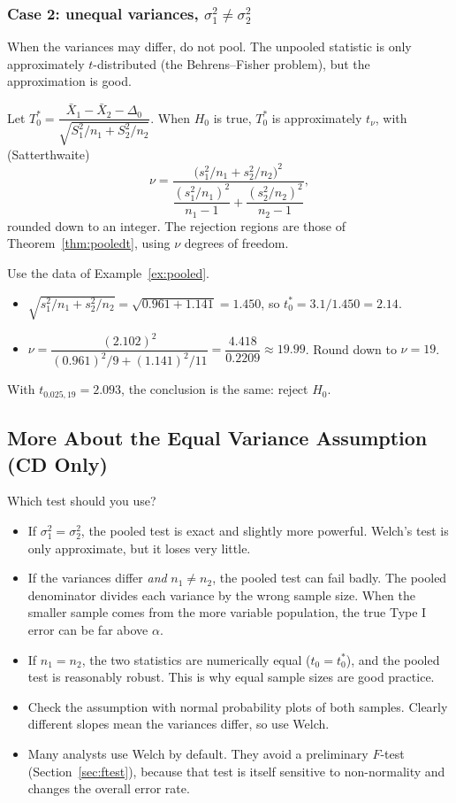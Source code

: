 \subsubsection*{Case 2: unequal variances, $\sigma_1^2\ne\sigma_2^2$}

When the variances may differ, do not pool. The unpooled statistic is only approximately $t$-distributed (the Behrens--Fisher problem), but the approximation is good.

\begin{theorem}\label{thm:welch}
Let $T_0^*=\dfrac{\bar{X}_1-\bar{X}_2-\Delta_0}{\sqrt{S_1^2/n_1+S_2^2/n_2}}$. When $H_0$ is true, $T_0^*$ is approximately $t_\nu$, with (Satterthwaite)
\[ \nu=\frac{\big(s_1^2/n_1+s_2^2/n_2\big)^2}{\dfrac{(s_1^2/n_1)^2}{n_1-1}+\dfrac{(s_2^2/n_2)^2}{n_2-1}}, \]
rounded down to an integer. The rejection regions are those of Theorem~\ref{thm:pooledt}, using $\nu$ degrees of freedom.
\end{theorem}

\begin{example}
Use the data of Example~\ref{ex:pooled}.
\begin{itemize}
  \item $\sqrt{s_1^2/n_1+s_2^2/n_2}=\sqrt{0.961+1.141}=1.450$, so $t_0^*=3.1/1.450=2.14$.
  \item $\nu=\dfrac{(2.102)^2}{(0.961)^2/9+(1.141)^2/11}=\dfrac{4.418}{0.2209}\approx19.99$. Round down to $\nu=19$.
\end{itemize}
With $t_{0.025,19}=2.093$, the conclusion is the same: reject $H_0$.
\end{example}

\subsection{More About the Equal Variance Assumption (CD Only)}

Which test should you use?
\begin{itemize}
  \item If $\sigma_1^2=\sigma_2^2$, the pooled test is exact and slightly more powerful. Welch's test is only approximate, but it loses very little.
  \item If the variances differ \emph{and} $n_1\ne n_2$, the pooled test can fail badly. The pooled denominator divides each variance by the wrong sample size. When the smaller sample comes from the more variable population, the true Type I error can be far above $\alpha$.
  \item If $n_1=n_2$, the two statistics are numerically equal ($t_0=t_0^*$), and the pooled test is reasonably robust. This is why equal sample sizes are good practice.
  \item Check the assumption with normal probability plots of both samples. Clearly different slopes mean the variances differ, so use Welch.
  \item Many analysts use Welch by default. They avoid a preliminary $F$-test (Section~\ref{sec:ftest}), because that test is itself sensitive to non-normality and changes the overall error rate.
\end{itemize}

